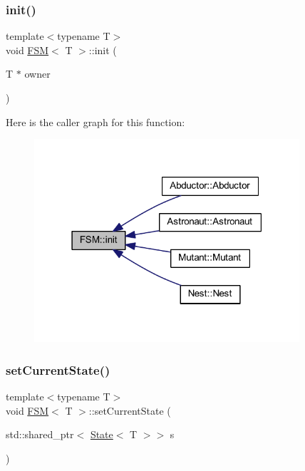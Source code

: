 \mbox{\label{class_f_s_m_a8e498afa4815129fb8415cddf53a4598}} 
\subsubsection{\texorpdfstring{init()}{init()}}
{\footnotesize\ttfamily template$<$typename T$>$ \\
void \hyperlink{class_f_s_m}{F\+SM}$<$ T $>$\+::init (\begin{DoxyParamCaption}\item[{T $\ast$}]{owner }\end{DoxyParamCaption})\hspace{0.3cm}{\ttfamily [inline]}}

Here is the caller graph for this function\+:
\nopagebreak
\begin{figure}[H]
\begin{center}
\leavevmode
\includegraphics[width=279pt]{class_f_s_m_a8e498afa4815129fb8415cddf53a4598_icgraph}
\end{center}
\end{figure}
\mbox{\label{class_f_s_m_a61ae5e4ce16b7bbef3cb940ac5e52cf5}} 
\subsubsection{\texorpdfstring{set\+Current\+State()}{setCurrentState()}}
{\footnotesize\ttfamily template$<$typename T$>$ \\
void \hyperlink{class_f_s_m}{F\+SM}$<$ T $>$\+::set\+Current\+State (\begin{DoxyParamCaption}\item[{std\+::shared\+\_\+ptr$<$ \hyperlink{class_state}{State}$<$ T $>$$>$}]{s }\end{DoxyParamCaption})\hspace{0.3cm}{\ttfamily [inline]}}

